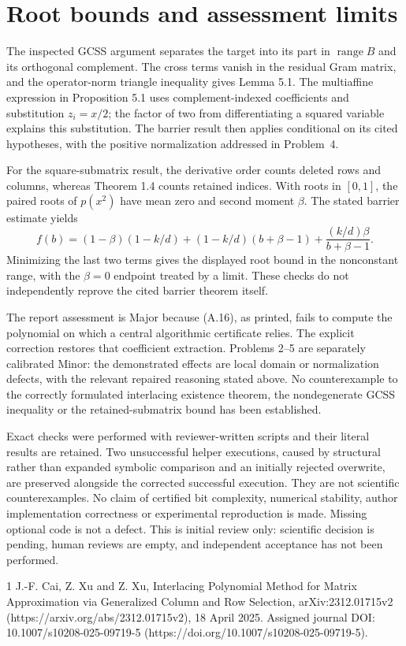 \documentclass[10pt]{article}
\begin{document}
\section*{Root bounds and assessment limits}
The inspected GCSS argument separates the target into its part in \(\operatorname{range}B\) and its orthogonal complement. The cross terms vanish in the residual Gram matrix, and the operator-norm triangle inequality gives Lemma 5.1. The multiaffine expression in Proposition 5.1 uses complement-indexed coefficients and substitution \(z_i=x/2\); the factor of two from differentiating a squared variable explains this substitution. The barrier result then applies conditional on its cited hypotheses, with the positive normalization addressed in Problem 4.\par
For the square-submatrix result, the derivative order counts deleted rows and columns, whereas Theorem 1.4 counts retained indices. With roots in \([0,1]\), the paired roots of \(p(x^2)\) have mean zero and second moment \(\beta\). The stated barrier estimate yields \[f(b)=(1-\beta)(1-k/d)
       +(1-k/d)(b+\beta-1)
       +\frac{(k/d)\beta}{b+\beta-1}.\] Minimizing the last two terms gives the displayed root bound in the nonconstant range, with the \(\beta=0\) endpoint treated by a limit. These checks do not independently reprove the cited barrier theorem itself.\par
The report assessment is Major because (A.16), as printed, fails to compute the polynomial on which a central algorithmic certificate relies. The explicit correction restores that coefficient extraction. Problems 2–5 are separately calibrated Minor: the demonstrated effects are local domain or normalization defects, with the relevant repaired reasoning stated above. No counterexample to the correctly formulated interlacing existence theorem, the nondegenerate GCSS inequality or the retained-submatrix bound has been established.\par
Exact checks were performed with reviewer-written scripts and their literal results are retained. Two unsuccessful helper executions, caused by structural rather than expanded symbolic comparison and an initially rejected overwrite, are preserved alongside the corrected successful execution. They are not scientific counterexamples. No claim of certified bit complexity, numerical stability, author implementation correctness or experimental reproduction is made. Missing optional code is not a defect. This is initial review only: scientific decision is pending, human reviews are empty, and independent acceptance has not been performed.\par
1 J.-F. Cai, Z. Xu and Z. Xu, Interlacing Polynomial Method for Matrix Approximation via Generalized Column and Row Selection, arXiv:2312.01715v2 (https://arxiv.org/abs/2312.01715v2), 18 April 2025. Assigned journal DOI: 10.1007/s10208-025-09719-5 (https://doi.org/10.1007/s10208-025-09719-5).\par
\end{document}
